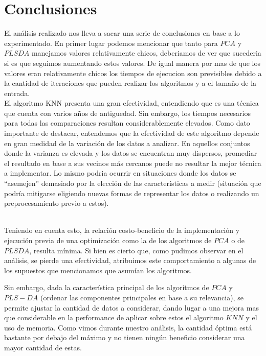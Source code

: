 \section{Conclusiones}
El análisis realizado nos lleva a sacar una serie de conclusiones en base a lo experimentado.
En primer lugar podemos mencionar que tanto para $PCA$ y $PLSDA$ manejamos valores relativamente chicos, deberiamos de ver que sucederia si es que seguimos aumentando estos valores. De igual manera por mas de que los valores eran relativamente chicos 
los tiempos de ejecucion son previsibles debido a la cantidad de iteraciones que pueden realizar los algoritmos y a el tamaño de la entrada.
\\
El algoritmo KNN presenta una gran efectividad, entendiendo que es una técnica que cuenta con varios años de antiguedad. Sin embargo, los tiempos necesarios para todas las comparaciones resultan considerablemente elevados.
Como dato importante de destacar, entendemos que la efectividad de este algoritmo depende en gran medidad de la variación de los datos a analizar. En aquellos conjuntos donde la varianza es elevada y los datos se encuentran muy dispersos, promediar el resultado en base a sus vecinos más cercanos puede no resultar la mejor técnica a implementar. Lo mismo podria ocurrir en situaciones donde los datos se ``asemejen''  demasiado por la elección de las características a medir (situación que podría mitigarse eligiendo nuevas formas de representar los datos o realizando un preprocesamiento previo a estos).

\\
Teniendo en cuenta esto, la relación costo-beneficio de la implementación y ejecución previa de una optimización como la de los algoritmos de $PCA$ o de $PLSDA$, resulta mínima. Si bien es cierto que, como pudimos observar en el análisis, se pierde una efectividad, atribuimos este comportamiento a algunas de los supuestos que mencionamos que asumían los algoritmos.

Sin embargo, dada la característica principal de los algoritmos de $PCA$ y $PLS-DA$ (ordenar las componentes principales en base a su relevancia), se permite ajustar la cantidad de datos a considerar, dando lugar a una mejora mas que considerable en la performance de aplicar sobre estos el algoritmo $KNN$ y el uso de memoria. Como vimos durante nuestro análisis, la cantidad óptima está bastante por debajo del máximo y no tienen ningún beneficio considerar una mayor cantidad de estas.

